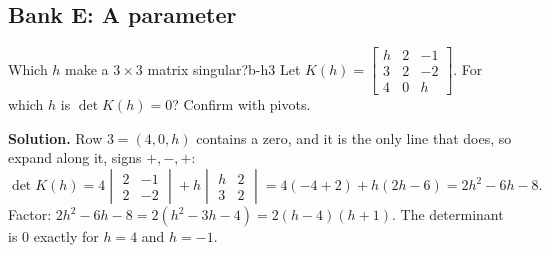 \documentclass[11pt]{article}
\begin{document}
\subsection*{Bank E: A parameter}

\begin{exmp}{Which $h$ make a $3\times3$ matrix singular?}{b-h3}
Let $K(h)=\begin{bmatrix}h&2&-1\\3&2&-2\\4&0&h\end{bmatrix}$. For which $h$ is $\det K(h)=0$? Confirm with pivots.

\textbf{Solution.} Row $3=(4,0,h)$ contains a zero, and it is the only line that does, so expand along it, signs $+,-,+$:
\[
\det K(h)=4\begin{vmatrix}2&-1\\2&-2\end{vmatrix}+h\begin{vmatrix}h&2\\3&2\end{vmatrix}=4(-4+2)+h(2h-6)=2h^2-6h-8.
\]
Factor: $2h^2-6h-8=2(h^2-3h-4)=2(h-4)(h+1)$. The determinant is $0$ exactly for $h=4$ and $h=-1$.


\end{exmp}
\end{document}
